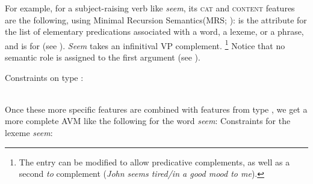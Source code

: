 \documentclass[output=paper
	        ,collection
	        ,collectionchapter
 	        ,biblatex
                ,babelshorthands
                ,newtxmath
                ,draftmode
                ,colorlinks, citecolor=brown
]{langscibook}
\begin{document}
For example, for a subject-raising verb like \emph{seem}, its \textsc{cat} and \textsc{content}
features are the following, using Minimal Recursion Semantics\indexmrs (MRS; \citealp{CFPS2005a}):  is the
attribute for the list of elementary predications associated with a word, a lexeme, or a phrase, and
 is for  (see ). 
\emph{Seem} takes an infinitival VP complement.%
%
\footnote{The entry can be modified to allow predicative complements, as well as a second \emph{to} complement (\emph{John seems tired/in a good mood to me}).}
%
Notice that no semantic role is assigned to the first argument (see ).

\eas
Constraints on type  :\label{ex:prop23}\\
 \impl {}\\
\zs

\noindent
Once these more specific features are combined with features from  type , we get a
more complete AVM like the following for the word \emph{seem}:
\ea\label{ex:prop24}
Constraints for the lexeme \emph{seem}:\\
\z
\end{document}
